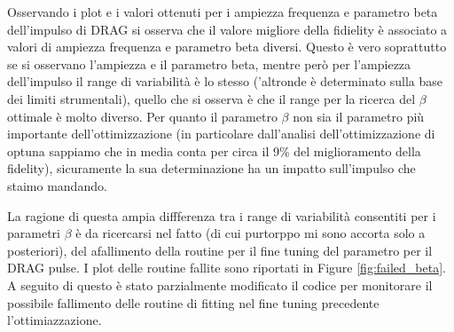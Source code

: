 Osservando i plot e i valori ottenuti per i ampiezza frequenza e parametro beta dell'impulso di DRAG si osserva che il valore migliore della fidielity è associato a valori di ampiezza frequenza e parametro beta diversi.
Questo è vero soprattutto se si osservano l'ampiezza e il parametro beta, mentre però per l'ampiezza dell'impulso il range di variabilità è lo stesso ('altronde è determinato sulla base dei limiti strumentali), quello che si osserva è che il range per la ricerca del $\beta$ ottimale è molto diverso.
Per quanto il parametro $\beta$ non sia il parametro più importante dell'ottimizzazione (in particolare dall'analisi dell'ottimizzazione di optuna sappiamo che in media conta per circa il 9\% del miglioramento della fidelity), sicuramente la sua determinazione ha un impatto sull'impulso che staimo mandando.

La ragione di questa ampia diffferenza tra i range di variabilità consentiti per i parametri $\beta$ è da ricercarsi nel fatto (di cui purtorppo mi sono accorta solo a posteriori), del afallimento della routine per il fine tuning del parametro per il DRAG pulse.
I plot delle routine fallite sono riportati in Figure \ref{fig:failed_beta}.
A seguito di questo è stato parzialmente modificato il codice per monitorare il possibile fallimento delle routine di fitting nel fine tuning precedente l'ottimiazzazione.

